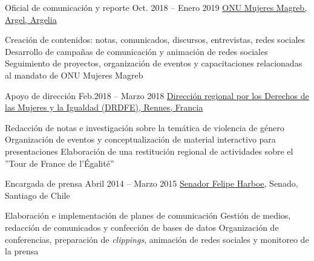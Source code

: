 \begin{joblist}

\item[Oficial de comunicación y reporte]{Oct. 2018 -- Enero 2019 }     
	{
	\href{http://maghreb.unwomen.org/fr}{ONU Mujeres Magreb, Argel, Argelia}
	}     
	{
		\normalsize{
		\vspace{-0.5cm}
		\begin{itemize}
			  \iftbftiny \setlength\itemsep{-3pt} \fi
			  \cvitem[\checkmark] Creación de contenidos: notas, comunicados, discursos, entrevistas, redes sociales
 			  \cvitem[\checkmark] Desarrollo de campañas de comunicación y animación de redes sociales                                      
			  \cvitem[\checkmark] Seguimiento de proyectos, organización de eventos y capacitaciones relacionadas al mandato de ONU Mujeres Magreb
		\end{itemize}      
        }
	}


\item[Apoyo de dirección]{Feb.2018 -- Marzo 2018 }     
	{
	\tbflogo{../Figure/logo/drdfe_128.png}
	\href{https://www.egalite-femmes-hommes.gouv.fr/le-secretariat-d-etat/organisation-du-ministere/services-territoriaux/annuaire-des-equipes-regionales-et-departementales/}{Dirección regional por los Derechos de las Mujeres y la Igualdad (DRDFE), Rennes, Francia}
	}     
	{
		\normalsize{            		
		\iftbftiny \vspace{-0.5cm} \fi
		\begin{itemize}
			  \iftbftiny \setlength\itemsep{-3pt} \fi
			  \cvitem[\checkmark] Redacción de notas e investigación sobre la temática de violencia de género
			  \cvitem[\checkmark] Organización de eventos y conceptualización de material interactivo para presentaciones 
			  \cvitem[\checkmark] Elaboración de una restitución regional de actividades sobre el ''Tour de France de l'Égalité''
		\end{itemize}      
        }
	}



\item[Encargada de prensa ]{Abril 2014 -- Marzo 2015}
     {
     \href{https://www.harboe.cl/}{Senador Felipe Harboe}, Senado, Santiago de Chile
     } 
	 {
		\normalsize{
		\iftbftiny \vspace{-0.5cm} \fi
			\begin{itemize}
			  \iftbftiny \setlength\itemsep{-3pt} \fi
			  \cvitem[\checkmark] Elaboración e implementación de planes de comunicación
			  \cvitem[\checkmark] Gestión de medios, redacción de comunicados y confección de bases de datos 
			  \cvitem[\checkmark] Organización de conferencias, preparación de \textit{clippings}, animación de redes sociales y monitoreo de la prensa 
			  

\end{itemize}}}
\end{joblist}
